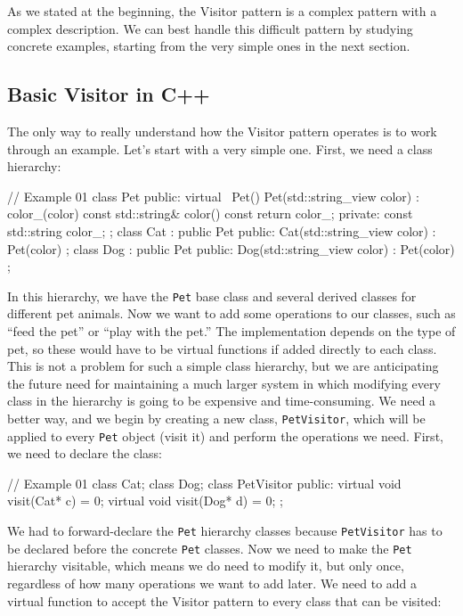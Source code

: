 As we stated at the beginning, the Visitor pattern is a complex pattern with a complex description. We can best handle this difficult pattern by studying concrete examples, starting from the very simple ones in the next section.

\subsection{Basic Visitor in C++}

The only way to really understand how the Visitor pattern operates is to work through an example. Let's start with a very simple one. First, we need a class hierarchy:

\begin{code}
// Example 01
class Pet {
  public:
  virtual ~Pet() {}
  Pet(std::string_view color) : color_(color) {}
  const std::string& color() const { return color_; }
  private:
  const std::string color_;
};
class Cat : public Pet {
  public:
  Cat(std::string_view color) : Pet(color) {}
};
class Dog : public Pet {
  public:
  Dog(std::string_view color) : Pet(color) {}
};
\end{code}

In this hierarchy, we have the \texttt{Pet} base class and several derived classes for different pet animals. Now we want to add some operations to our classes, such as ``feed the pet'' or ``play with the pet.'' The implementation depends on the type of pet, so these would have to be virtual functions if added directly to each class. This is not a problem for such a simple class hierarchy, but we are anticipating the future need for maintaining a much larger system in which modifying every class in the hierarchy is going to be expensive and time-consuming. We need a better way, and we begin by creating a new class, \texttt{PetVisitor}, which will be applied to every \texttt{Pet} object (visit it) and perform the operations we need. First, we need to declare the class:

\begin{code}
// Example 01
class Cat;
class Dog;
class PetVisitor {
  public:
  virtual void visit(Cat* c) = 0;
  virtual void visit(Dog* d) = 0;
};
\end{code}

We had to forward-declare the \texttt{Pet} hierarchy classes because \texttt{PetVisitor} has to be declared before the concrete \texttt{Pet} classes. Now we need to make the \texttt{Pet} hierarchy visitable, which means we do need to modify it, but only once, regardless of how many operations we want to add later. We need to add a virtual function to accept the Visitor pattern to every class that can be visited:

